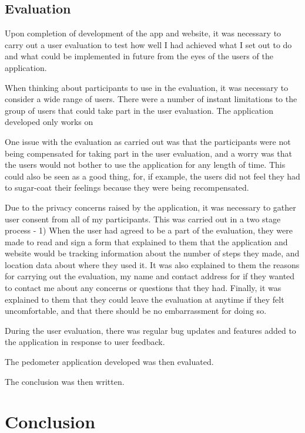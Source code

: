 \documentclass{l4proj}
\begin{document}
\section{Evaluation}

Upon completion of development of the app and website, it was necessary to carry out a user evaluation to test how well I had achieved what I set out to do and what could be implemented in future from the eyes of the users of the application.

When thinking about participants to use in the evaluation, it was necessary to consider a wide range of users. There were a number of instant limitations to the group of users that could take part in the user evaluation. The application developed only works on 

One issue with the evaluation as carried out was that the participants were not being compensated for taking part in the user evaluation, and a worry was that the users would not bother to use the application for any length of time. This could also be seen as a good thing, for, if example, the users did not feel they had to sugar-coat their feelings because they were being recompensated.
 
Due to the privacy concerns raised by the application, it was necessary to gather user consent from all of my participants. This was carried out in a two stage process - 1) When the user had agreed to be a part of the evaluation, they were made to read and sign a form that explained to them that the application and website would be tracking information about the number of steps they made, and location data about where they used it. It was also explained to them the reasons for carrying out the evaluation, my name and contact address for if they wanted to contact me about any concerns or questions that they had. Finally, it was explained to them that they could leave the evaluation at anytime if they felt uncomfortable, and that there should be no embarrassment for doing so.

During the user evaluation, there was regular bug updates and features added to the application in response to user feedback.

The pedometer application developed was then evaluated.

The conclusion was then written.


\chapter{Conclusion}
\end{document}
